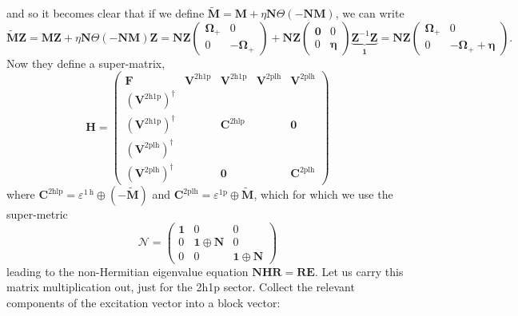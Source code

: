 and so it becomes clear that if we define $\tilde{\bm{M}} = \bm{M} + \eta \bm{N}\Theta(-\bm{N}\bm{M})$, we can write
\begin{equation}
    \tilde{\bm{M}} \bm{Z} = \bm{M} \bm{Z} + \eta \bm{N}\Theta(-\bm{N}\bm{M}) \bm{Z} = \mathbf{N}\bm{Z}\left(\begin{array}{cc}
\boldsymbol{\Omega}_{+} & 0 \\
0 & -\boldsymbol{\Omega}_{+}
\end{array}\right) + \bm{N}\bm{Z} \left(\begin{array}{cc}\bm{0} & 0 \\ 0 & \bm{\eta}\end{array}\right) \underbrace{\bm{Z}^{-1} \bm{Z}}_{ \bm{1}} = \bm{N}\bm{Z}\left(\begin{array}{cc}\boldsymbol{\Omega}_{+} & 0 \\ 0 & -\boldsymbol{\Omega}_{+} + \bm{\eta}\end{array}\right).
\end{equation}
Now they define a super-matrix,
\begin{equation}
\bm{H} =
\begin{pmatrix}
\bm{F} & \bm{V}^{2\mathrm{h1p}} & \bm{V}^{2\mathrm{h1p}} & \bm{V}^{2\mathrm{plh}} & \bm{V}^{2\mathrm{plh}} \\
\left(\bm{V}^{2\mathrm{h1p}}\right)^{\dagger} &  &  & & \\
\left(\bm{V}^{2\mathrm{h1p}}\right)^{\dagger} &  & \bm{C}^{2\mathrm{hlp}} & & \bm{0} \\
\left(\bm{V}^{2\mathrm{plh}}\right)^{\dagger} & & & & \\
\left(\bm{V}^{2\mathrm{plh}}\right)^{\dagger} &  & \bm{0} & & \bm{C}^{2\mathrm{plh}}
\end{pmatrix}
\end{equation}
where $\mathbf{C}^{2 \mathrm{hlp}}=\varepsilon^{1 \mathrm{~h}} \oplus(-\tilde{\mathbf{M}})$ and $\mathbf{C}^{2 \mathrm{plh}}=\varepsilon^{1 \mathrm{p}} \oplus \tilde{\mathbf{M}}$, which for which we use the super-metric
$$
\bm{\mathcal{N}}=\left(\begin{array}{ccc}
\bm{1} & 0 & 0 \\
0 & \bm{1} \oplus \bm{N} & 0 \\
0 & 0 & \bm{1} \oplus \bm{N}
\end{array}\right)
$$
leading to the non-Hermitian eigenvalue equation $\mathcal{\bm{N}} \bm{H} \bm{R} = \bm{R} \bm{E}$. Let us carry this matrix multiplication out, just for the 2h1p sector. Collect the relevant components of the excitation vector into a block vector:
